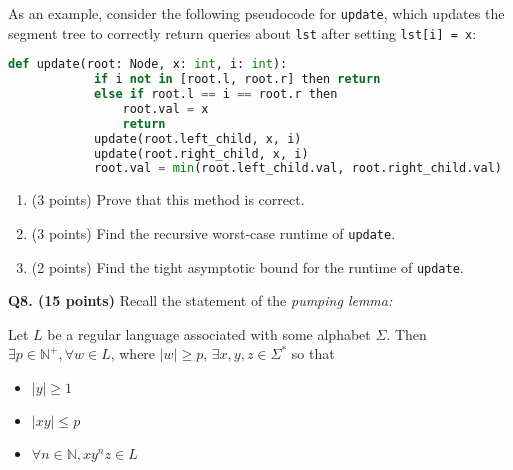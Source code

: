 \documentclass{article}
\begin{document}
    \medskip

    As an example, consider the following pseudocode for \texttt{update}, which updates the segment tree to correctly return queries about \texttt{lst} after setting \texttt{lst[i] = x}:

    \begin{lstlisting}[language=Python]
        def update(root: Node, x: int, i: int):
            if i not in [root.l, root.r] then return
            else if root.l == i == root.r then
                root.val = x
                return
            update(root.left_child, x, i)
            update(root.right_child, x, i)
            root.val = min(root.left_child.val, root.right_child.val)
    \end{lstlisting}
    \begin{enumerate}[label=\alph*)]
        \item (3 points) Prove that this method is correct.
        \pagebreak
        \item (3 points) Find the recursive worst-case runtime of \texttt{update}.
        \vfill
        \item (2 points) Find the tight asymptotic bound for the runtime of \texttt{update}.
        \vfill
    \end{enumerate}

    \pagebreak

    \textbf{Q8. (15 points)} Recall the statement of the \textit{pumping lemma:}

    \smallskip

    \noindent Let \(L\) be a regular language associated with some alphabet \(\Sigma\). Then \(\exists p \in \mathbb{N} ^+, \forall w \in L\), where \(|w| \geq p\), \(\exists x,y,z \in \Sigma ^*\) so that
    \begin{itemize}
        \item \(|y| \geq 1\)
        \item \(|xy| \leq p\)
        \item \(\forall n \in \mathbb{N}, xy^nz \in L\) 
    \end{itemize}
\end{document}

